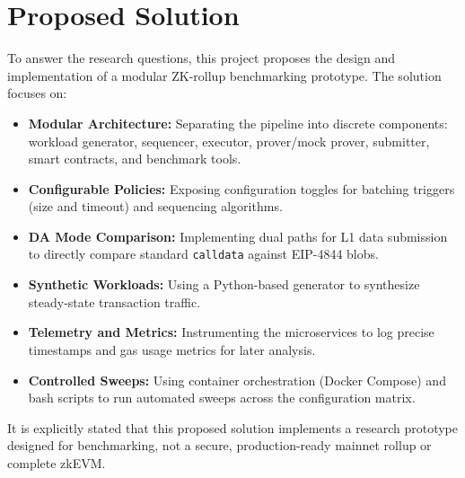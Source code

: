 \section{Proposed Solution}
\label{sec:proposed_solution}
To answer the research questions, this project proposes the design and implementation of a modular ZK-rollup benchmarking prototype. The solution focuses on:
\begin{itemize}
    \item \textbf{Modular Architecture:} Separating the pipeline into discrete components: workload generator, sequencer, executor, prover/mock prover, submitter, smart contracts, and benchmark tools.
    \item \textbf{Configurable Policies:} Exposing configuration toggles for batching triggers (size and timeout) and sequencing algorithms.
    \item \textbf{DA Mode Comparison:} Implementing dual paths for L1 data submission to directly compare standard \texttt{calldata} against EIP-4844 blobs.
    \item \textbf{Synthetic Workloads:} Using a Python-based generator to synthesize steady-state transaction traffic.
    \item \textbf{Telemetry and Metrics:} Instrumenting the microservices to log precise timestamps and gas usage metrics for later analysis.
    \item \textbf{Controlled Sweeps:} Using container orchestration (Docker Compose) and bash scripts to run automated sweeps across the configuration matrix.
\end{itemize}
It is explicitly stated that this proposed solution implements a research prototype designed for benchmarking, not a secure, production-ready mainnet rollup or complete zkEVM.